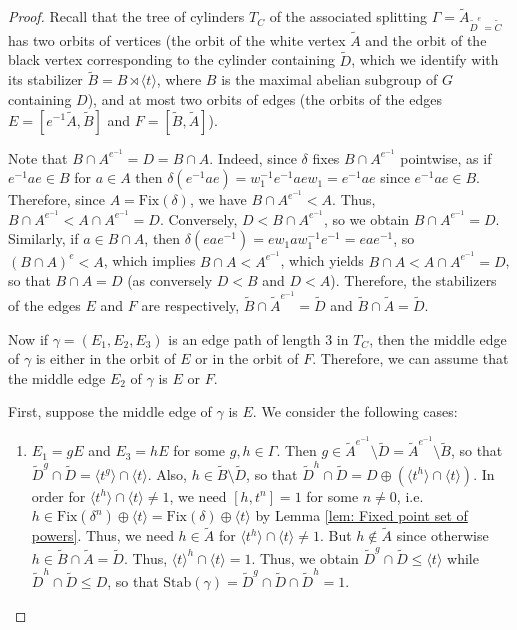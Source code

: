 \documentclass{amsart}
\theoremstyle{plain}
\theoremstyle{definition}
\theoremstyle{remark}
\begin{document}
\begin{proof}
    Recall that the tree of cylinders $T_C$ of the associated splitting  $\Gamma = \tilde{A}_{\tilde{D}^e = \tilde{C}}$ has two orbits of vertices (the orbit of the white vertex $\tilde{A}$ and the orbit of the black vertex corresponding to the cylinder containing $\tilde{D}$, which we identify with its stabilizer $\tilde{B} = B \rtimes \langle t \rangle$, where $B$ is the maximal abelian subgroup of $G$ containing $D$), and at most two orbits of edges (the orbits of the edges $E=[e^{-1}\tilde{A}, \tilde{B}]$ and $F=[\tilde{B}, \tilde{A}]$).

    Note that $B \cap A^{e^{-1}} = D = B \cap A$. Indeed, since $\delta$ fixes $B \cap A^{e^{-1}}$ pointwise, as if $e^{-1}ae \in B$ for $a \in A$ then $\delta(e^{-1}ae) = w_1^{-1}e^{-1}aew_1 = e^{-1}ae$ since $e^{-1}ae \in B$. Therefore, since $A = \mathrm{Fix}(\delta)$, we have $B \cap A^{e^{-1}} < A$. Thus, $B \cap A^{e^{-1}} < A \cap A^{e^{-1}}=D$. Conversely, $D < B \cap A^{e^{-1}}$, so we obtain $B \cap A^{e^{-1}} = D$. Similarly, if $a \in B \cap A$, then $\delta(eae^{-1}) = ew_1 a w_1^{-1}e^{-1} = eae^{-1}$, so $(B \cap A)^{e} < A$, which implies $B \cap A < A^{e^{-1}}$, which yields $B \cap A < A \cap A^{e^{-1}}=D$, so that $B \cap A = D$ (as conversely $D < B$ and $D < A$). Therefore, the stabilizers of the edges $E$ and $F$ are respectively, $\tilde{B} \cap \tilde{A}^{e^{-1}} = \tilde{D}$ and $\tilde{B} \cap \tilde{A} = \tilde{D}$. 

    Now if $\gamma = (E_1,E_2,E_3)$ is an edge path of length 3 in $T_C$, then the middle edge of $\gamma$ is either in the orbit of $E$ or in the orbit of $F$. Therefore, we can assume that the middle edge $E_2$ of $\gamma$ is $E$ or $F$. 

    First, suppose the middle edge of $\gamma$ is $E$. We consider the following cases: 

    \begin{enumerate}
        \item $E_1 = gE$ and $E_3 = hE$ for some $g,h \in \Gamma$. Then $g \in \tilde{A}^{e^{-1}} \setminus \tilde{D} = \tilde{A}^{e^{-1}} \setminus \tilde{B}$, so that $\tilde{D}^g \cap \tilde{D} = \langle t^g \rangle \cap \langle t \rangle$. Also, $h \in \tilde{B} \setminus \tilde{D}$, so that $\tilde{D}^h \cap \tilde{D} = D \oplus (\langle t^h \rangle \cap \langle t \rangle)$. In order for $\langle t^h \rangle \cap \langle t \rangle \neq 1$, we need $[h,t^n] = 1$ for some $n \neq 0$, i.e.\ $h \in \mathrm{Fix}(\delta^n) \oplus \langle t \rangle = \mathrm{Fix}(\delta) \oplus \langle t \rangle$ by Lemma \ref{lem: Fixed point set of powers}. Thus, we need $h \in \tilde{A}$ for $\langle t^h \rangle \cap \langle t \rangle \neq 1$. But $h \notin \tilde{A}$ since otherwise $h \in \tilde{B} \cap \tilde{A} = \tilde{D}$. Thus, $\langle t \rangle^h \cap \langle t \rangle = 1$. Thus, we obtain $\tilde{D}^g \cap \tilde{D} \leq \langle t \rangle$ while $\tilde{D}^h \cap \tilde{D} \leq D$, so that $\mathrm{Stab}(\gamma) = \tilde{D}^g \cap \tilde{D} \cap \tilde{D}^h = 1$. 


\end{enumerate}
\end{proof}
\end{document}
